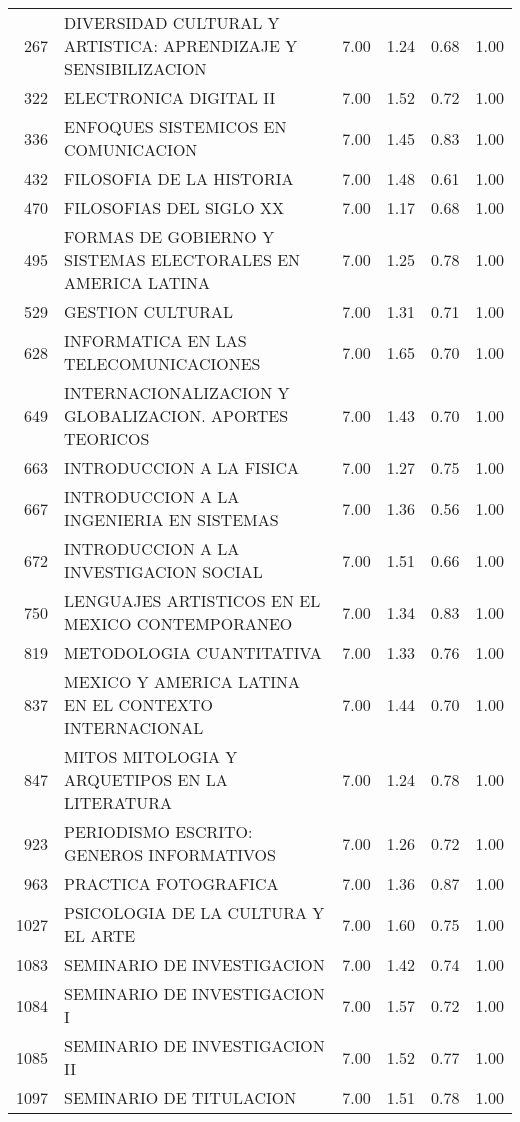 \documentclass[12pt]{article}
\begin{document}
\begin{table}[ht]
\begin{tabular}{rlrrrr}
  267 & DIVERSIDAD CULTURAL Y ARTISTICA: APRENDIZAJE Y SENSIBILIZACION & 7.00 & 1.24 & 0.68 & 1.00 \\ 
  322 & ELECTRONICA DIGITAL II & 7.00 & 1.52 & 0.72 & 1.00 \\ 
  336 & ENFOQUES SISTEMICOS EN COMUNICACION & 7.00 & 1.45 & 0.83 & 1.00 \\ 
  432 & FILOSOFIA DE LA HISTORIA & 7.00 & 1.48 & 0.61 & 1.00 \\ 
  470 & FILOSOFIAS DEL SIGLO XX & 7.00 & 1.17 & 0.68 & 1.00 \\ 
  495 & FORMAS DE GOBIERNO Y SISTEMAS ELECTORALES EN AMERICA LATINA & 7.00 & 1.25 & 0.78 & 1.00 \\ 
  529 & GESTION CULTURAL & 7.00 & 1.31 & 0.71 & 1.00 \\ 
  628 & INFORMATICA EN LAS TELECOMUNICACIONES & 7.00 & 1.65 & 0.70 & 1.00 \\ 
  649 & INTERNACIONALIZACION Y GLOBALIZACION. APORTES TEORICOS & 7.00 & 1.43 & 0.70 & 1.00 \\ 
  663 & INTRODUCCION A LA FISICA & 7.00 & 1.27 & 0.75 & 1.00 \\ 
  667 & INTRODUCCION A LA INGENIERIA EN SISTEMAS & 7.00 & 1.36 & 0.56 & 1.00 \\ 
  672 & INTRODUCCION A LA INVESTIGACION SOCIAL & 7.00 & 1.51 & 0.66 & 1.00 \\ 
  750 & LENGUAJES ARTISTICOS EN EL MEXICO CONTEMPORANEO & 7.00 & 1.34 & 0.83 & 1.00 \\ 
  819 & METODOLOGIA CUANTITATIVA & 7.00 & 1.33 & 0.76 & 1.00 \\ 
  837 & MEXICO Y AMERICA LATINA EN EL CONTEXTO INTERNACIONAL & 7.00 & 1.44 & 0.70 & 1.00 \\ 
  847 & MITOS MITOLOGIA Y ARQUETIPOS EN LA LITERATURA & 7.00 & 1.24 & 0.78 & 1.00 \\ 
  923 & PERIODISMO ESCRITO: GENEROS INFORMATIVOS & 7.00 & 1.26 & 0.72 & 1.00 \\ 
  963 & PRACTICA FOTOGRAFICA & 7.00 & 1.36 & 0.87 & 1.00 \\ 
  1027 & PSICOLOGIA DE LA CULTURA Y EL ARTE & 7.00 & 1.60 & 0.75 & 1.00 \\ 
  1083 & SEMINARIO DE INVESTIGACION & 7.00 & 1.42 & 0.74 & 1.00 \\ 
  1084 & SEMINARIO DE INVESTIGACION I & 7.00 & 1.57 & 0.72 & 1.00 \\ 
  1085 & SEMINARIO DE INVESTIGACION II & 7.00 & 1.52 & 0.77 & 1.00 \\ 
  1097 & SEMINARIO DE TITULACION & 7.00 & 1.51 & 0.78 & 1.00 \\ 

\end{tabular}
\end{table}
\end{document}
